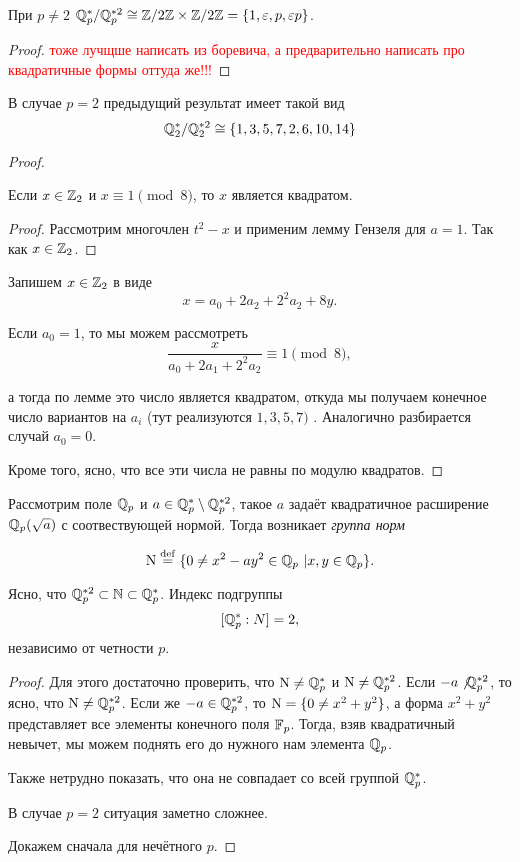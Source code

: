 	 \begin{statement} 
	 	При $p \neq 2$ $\mathbb{Q}_{p}^{*}/\mathbb{Q}_{p}^{*2} \cong \mathbb{Z}/2\mathbb{Z} \times \mathbb{Z}/2\mathbb{Z} = \{ 1, \varepsilon, p, \varepsilon p\}$.
	 \end{statement}

	 \begin{proof}
	 	\textcolor{red}{тоже лучщше написать из боревича, а предварительно написать про квадратичные формы оттуда же!!!}
	 \end{proof}

	 \begin{statement} 
	 	В случае $p = 2$ предыдущий результат имеет такой вид 
	 	\[
	 		\mathbb{Q}_{2}^{*}/\mathbb{Q}_{2}^{*2} \cong \{1, 3, 5, 7, 2, 6, 10, 14 \}
	 	\]
	 \end{statement}
	 \begin{proof}
	 	
	 	\begin{lemma} 
	 		Если $x \in \mathbb{Z}_{2}$ и $x \equiv 1 \pmod{8}$, то $x$ является квадратом. 
	 	\end{lemma}
	 	\begin{proof}
	 		Рассмотрим многочлен $t^2 - x$ и применим лемму Гензеля для $a = 1$. Так как $x \in \mathbb{Z}_{2}$.
	 	\end{proof}

	 	Запишем $x \in \mathbb{Z}_2$ в виде 
	 	\[
	 		x = a_0 + 2 a_2 + 2^2 a_2 + 8y.
	 	\]

	 	Если $a_0 = 1$, то  мы можем рассмотреть 
	 	\[
	 		\frac{x}{a_0 + 2 a_1 + 2^2 a_2} \equiv 1 \pmod{8},
	 	\]

	 	а тогда по лемме это число является квадратом, откуда мы получаем конечное число вариантов на $a_i$ (тут реализуются $1, 3, 5, 7)$ . Аналогично разбирается случай $a_0 = 0$.  

	 	Кроме того, ясно, что все эти числа не равны по модулю квадратов. 
	 \end{proof}

	 Рассмотрим поле $\mathbb{Q}_{p}$ и $a \in \mathbb{Q}_{p}^{*} \setminus \mathbb{Q}_{p}^{*2}$, такое $a$ задаёт квадратичное расширение $\mathbb{Q}_{p}(\sqrt{a})$ с соотвествующей нормой. Тогда возникает \emph{группа норм}

	 \[
	 	\operatorname{\mathrm{N}} \stackrel{\mathrm{def}}{=} \{ 0 \neq x^2 - ay^2 \in \mathbb{Q}_{p} \ \vert x, y \in \mathbb{Q}_{p} \}.
	 \]

	 Ясно, что $\mathbb{Q}_{p}^{*2} \subset \mathbb{N} \subset \mathbb{Q}_{p}^{*}$. Индекс подгруппы 
	 \[
	  	[\mathbb{Q}_{p}^{*} : N] = 2,
	  \] 
	  независимо от четности $p$.

	  \begin{proof}
	  Для этого достаточно проверить, что $\operatorname{\mathrm{N}} \neq \mathbb{Q}_{p}^{*}$ и $\operatorname{\mathrm{N}} \neq \mathbb{Q}_{p}^{*2}$. Если $-a \not \mathbb{Q}_{p}^{*2}$, то ясно, что $\operatorname{\mathrm{N}} \neq \mathbb{Q}_{p}^{*2}$. Если же $-a \in \mathbb{Q}_{p}^{*2}$, то $\operatorname{\mathrm{N}} = \{ 0 \neq x^2 + y^2 \}$, а форма $x^2 + y^2$ представляет все элементы конечного поля $\mathbb{F}_{p}$. Тогда, взяв квадратичный невычет, мы можем поднять его до нужного нам элемента $\mathbb{Q}_{p}$. 

	  Также нетрудно показать, что она не совпадает со всей группой $\mathbb{Q}_{p}^{*}$.

	  В случае $p = 2$ ситуация заметно сложнее. 

	  	Докажем сначала для нечётного $p$. 
	  \end{proof}

